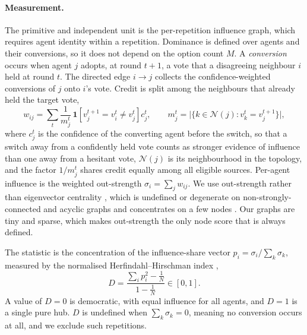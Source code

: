 \paragraph{Measurement.}
The primitive and independent unit is the per-repetition influence graph, which
requires agent identity within a repetition. Dominance is defined over agents and
their conversions, so it does not depend on the option count $M$. A
\emph{conversion} occurs when agent $j$ adopts, at round $t{+}1$, a vote that a
disagreeing neighbour $i$ held at round $t$. The directed edge $i \to j$ collects
the confidence-weighted conversions of $j$ onto $i$'s vote. Credit is split among
the neighbours that already held the target vote,
\begin{equation}
  w_{ij} = \sum_{t} \frac{1}{m_j^t}\,
           \mathbf{1}\!\left[v_j^{t+1} = v_i^{t} \neq v_j^{t}\right] c_j^{t},
  \qquad
  m_j^t = \bigl|\{k \in \mathcal{N}(j) : v_k^{t} = v_j^{t+1}\}\bigr|,
\end{equation}
where $c_j^t$ is the confidence of the converting agent before the switch, so that a switch
away from a confidently held vote counts as stronger evidence of influence than one
away from a hesitant vote, $\mathcal{N}(j)$ is its
neighbourhood in the topology, and the factor $1/m_j^t$ shares credit equally among
all eligible sources. Per-agent influence is the weighted out-strength
$\sigma_i = \sum_j w_{ij}$. We use out-strength rather than eigenvector centrality
\citep{bonacich1972factoring}, which is undefined or degenerate on
non-strongly-connected and acyclic graphs \citep{newman2010networks} and
concentrates on a few nodes \citep{martin2014localization}. Our graphs are tiny and
sparse, which makes out-strength the only node score that is always defined.

The statistic is the concentration of the influence-share vector
$p_i = \sigma_i / \sum_k \sigma_k$, measured by the normalised Herfindahl--Hirschman index
\citep{hirschman1964paternity},
\begin{equation}
  D = \frac{\sum_i p_i^2 - \tfrac{1}{N}}{1 - \tfrac{1}{N}} \in [0, 1].
\end{equation}
A value of $D = 0$ is democratic, with equal influence for all agents, and $D = 1$
is a single pure hub. $D$ is undefined when $\sum_k \sigma_k = 0$, meaning no
conversion occurs at all, and we exclude such repetitions.

